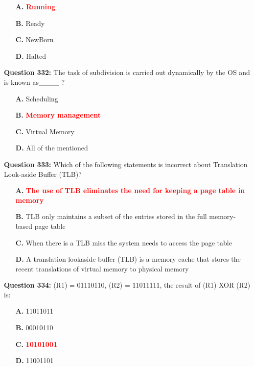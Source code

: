 \documentclass[12pt,a4paper]{article}
\begin{document}
\begin{itemize}
    \item[\textbf{A.}] \textcolor{red}{\textbf{Running}}
    \item[\textbf{B.}] Ready
    \item[\textbf{C.}] NewBorn
    \item[\textbf{D.}] Halted
\end{itemize}

\vspace{0.5cm}

\textbf{Question 332:} The task of subdivision is carried out dynamically by the OS and is known as____ ?

\begin{itemize}
    \item[\textbf{A.}] Scheduling
    \item[\textbf{B.}] \textcolor{red}{\textbf{Memory management}}
    \item[\textbf{C.}] Virtual Memory
    \item[\textbf{D.}] All of the mentioned
\end{itemize}

\vspace{0.5cm}

\textbf{Question 333:} Which of the following statements is incorrect about Translation Look-aside Buffer (TLB)?

\begin{itemize}
    \item[\textbf{A.}] \textcolor{red}{\textbf{The use of TLB eliminates the need for keeping a page table in memory}}
    \item[\textbf{B.}] TLB only maintains a subset of the entries stored in the full memory-based page table
    \item[\textbf{C.}] When there is a TLB miss the system needs to access the page table
    \item[\textbf{D.}] A translation lookaside buffer (TLB) is a memory cache that stores the recent translations of virtual memory to physical memory
\end{itemize}

\vspace{0.5cm}

\textbf{Question 334:} (R1) = 01110110, (R2) = 11011111, the result of (R1) XOR (R2) is:

\begin{itemize}
    \item[\textbf{A.}] 11011011
    \item[\textbf{B.}] 00010110
    \item[\textbf{C.}] \textcolor{red}{\textbf{10101001}}
    \item[\textbf{D.}] 11001101
\end{itemize}
\end{document}
